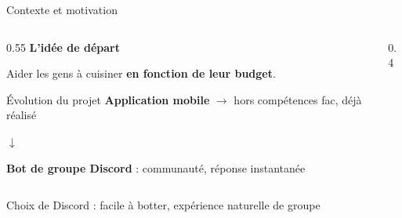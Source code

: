 \documentclass[aspectratio=169]{beamer}
\begin{document}
\begin{frame}{Contexte et motivation}
\begin{columns}[T]
\begin{column}{0.55\textwidth}
  \textbf{L'id\'ee de d\'epart}

  \vspace{0.3cm}
  Aider les gens \`a cuisiner \textbf{en fonction de leur budget}.

  \vspace{0.4cm}
  \begin{block}{\'Evolution du projet}
    \textbf{Application mobile} $\rightarrow$ hors comp\'etences fac, d\'ej\`a r\'ealis\'e

    \smallskip
    $\downarrow$

    \smallskip
    \textbf{Bot de groupe Discord} : communaut\'e, r\'eponse instantan\'ee
  \end{block}
\end{column}
\begin{column}{0.4\textwidth}
  \begin{center}
  \end{center}
\end{column}
\end{columns}

\vspace{0.3cm}
\textcolor{cgray}{\footnotesize Choix de Discord : facile \`a botter, exp\'erience naturelle de groupe}
\end{frame}
\end{document}
